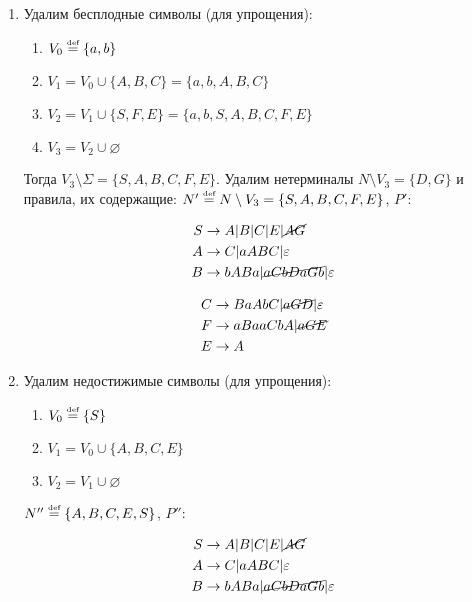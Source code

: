 \documentclass[a4paper]{article}
\def\eps{\varepsilon}
\def\eqdef{\overset{\mbox{\tiny def}}{=}}
\begin{document}
\begin{enumerate}
\item Удалим бесплодные символы (для упрощения):\begin{enumerate}
\item $V_0\eqdef \{a,b\}$
\item $V_1=V_0\cup\{A,B,C\}=\{a,b,A,B,C\}$
\item $V_2=V_1\cup\{S,F,E\}=\{a,b,S,A,B,C,F,E\}$
\item $V_3=V_2\cup\varnothing$
\end{enumerate}
Тогда $V_3\setminus\Sigma=\{S,A,B,C,F,E\}$. Удалим нетерминалы $N\setminus V_3=\{D,G\}$ и правила, их содержащие: $N'\eqdef N\setminus V_3=\{S,A,B,C,F,E\}$, $P'$:
\vspace{-7ex}
\begin{multicols}{2}
	\begin{align*}
		S &\to A|B|C|E|\cancel{AG} \\
		A &\to C |aABC|\eps\\
		B &\to bABa|\cancel{aCbDaGb}|\eps\\
	\end{align*}

	\begin{align*}
		C &\to BaAbC|\cancel{aGD}|\eps\\
		F &\to aBaaCbA|\cancel{aGE}\\
		E &\to A\\			
	\end{align*}	
\end{multicols}
\vspace{-7ex}
\item Удалим недостижимые символы (для упрощения):\begin{enumerate}
\item $V_0\eqdef\{S\}$
\item $V_1=V_0\cup\{A,B,C,E\}$
\item $V_2=V_1\cup\varnothing$
\end{enumerate}
$N''\eqdef\{A,B,C,E,S\}$, $P''$:
\vspace{-7ex}
\begin{multicols}{2}
	\begin{align*}
		S &\to A|B|C|E|\cancel{AG} \\
		A &\to C |aABC|\eps\\
		B &\to bABa|\cancel{aCbDaGb}|\eps\\
	\end{align*}


\end{multicols}
\end{enumerate}
\end{document}
